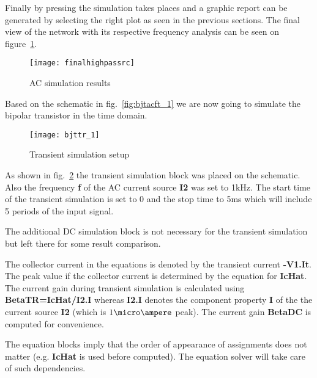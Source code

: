 Finally by pressing  the simulation takes places and a graphic
report can be generated by selecting the right plot as seen in the
previous sections. The final view of the network with its respective
frequency analysis can be seen on figure~\ref{fig:finalhighpassrc}.

\begin{figure}[ht]
  \centering
  \texttt{[image: finalhighpassrc]}
  \caption{AC simulation results}
  \label{fig:finalhighpassrc}
\end{figure}
\FloatBarrier


Based on the schematic in fig.~\ref{fig:bjtacft_1} we are now going to
simulate the bipolar transistor in the time domain.

\begin{figure}[ht]
  \centering
  \texttt{[image: bjttr\_1]}
  \caption{Transient simulation setup}
  \label{fig:ibjttr_1}
\end{figure}
\FloatBarrier

As shown in fig.~\ref{fig:ibjttr_1} the transient simulation block was
placed on the schematic.  Also the frequency \textbf{f} of the AC
current source \textbf{I2} was set to 1kHz.  The start time of the
transient simulation is set to 0 and the stop time to 5ms which will
include 5 periods of the input signal.

\medskip

The additional DC simulation block is not necessary for the transient
simulation but left there for some result comparison.

\medskip

The collector current in the equations is denoted by the transient
current \textbf{-V1.It}.  The peak value if the collector current is
determined by the equation for \textbf{IcHat}.  The current gain
during transient simulation is calculated using
\textbf{BetaTR=IcHat/I2.I} whereas \textbf{I2.I} denotes the component
property \textbf{I} of the the current source \textbf{I2} (which is
$1\micro\ampere$ peak).  The current gain \textbf{BetaDC} is computed
for convenience.

\medskip

The equation blocks imply that the order of appearance of assignments
does not matter (e.g. \textbf{IcHat} is used before computed).  The
equation solver will take care of such dependencies.


